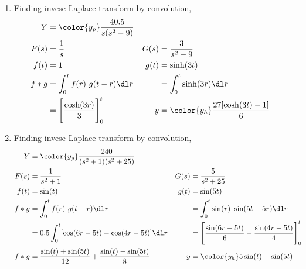 \begin{enumerate}
    \item Finding invese Laplace transform by convolution,
          \begin{align}
              Y     & = \color{y_p} \frac{40.5}{s(s^2 - 9)}       \\
              F(s)  & = \frac{1}{s}                             &
              G(s)  & = \frac{3}{s^2 - 9}                         \\
              f(t)  & = 1                                       &
              g(t)  & = \sinh(3t)                                 \\
              f * g & = \int_{0}^{t} f(r)\ g(t-r) \dl r         &
                    & = \int_{0}^{t} \sinh(3r) \dl r              \\
                    & = \Bigg[ \frac{\cosh(3r)}{3} \Bigg]_0^t   &
              y     & = \color{y_h} \frac{27[\cosh(3t) - 1]}{6}
          \end{align}

    \item Finding invese Laplace transform by convolution,
          \begin{align}
              Y     & = \color{y_p} \frac{240}{(s^2 + 1)(s^2 + 25)}                    \\
              F(s)  & = \frac{1}{s^2 + 1}                                            &
              G(s)  & = \frac{5}{s^2 + 25}                                             \\
              f(t)  & = \sin(t)                                                      &
              g(t)  & = \sin(5t)                                                       \\
              f * g & = \int_{0}^{t} f(r)\ g(t-r) \dl r                              &
                    & = \int_{0}^{t} \sin(r)\ \sin(5t - 5r) \dl r                      \\
                    & = 0.5\int_{0}^{t} [\cos(6r - 5t) - \cos(4r - 5t)] \dl r        &
                    & = \Bigg[ \frac{\sin(6r - 5t)}{6} - \frac{\sin(4r - 5t)}
              {4} \Bigg]_0^t                                                           \\
              f * g & = \frac{\sin(t) + \sin(5t)}{12} + \frac{\sin(t) - \sin(5t)}{8} &
              y     & = \color{y_h} 5\sin(t) - \sin(5t)
          \end{align}


\end{enumerate}
